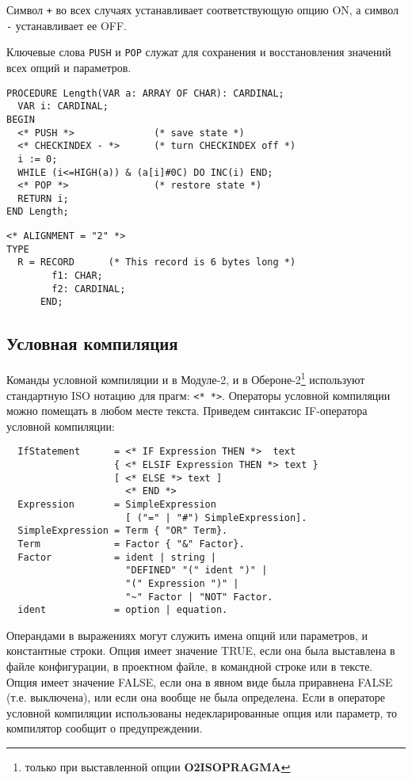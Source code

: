 Символ \verb|+| во всех случаях устанавливает соответствующую опцию
ON, а символ \verb|-| устанавливает ее OFF.

Ключевые слова {\tt PUSH} и {\tt POP} служат для сохранения 
и восстановления значений всех опций и параметров.

\Examples
\begin{verbatim}
PROCEDURE Length(VAR a: ARRAY OF CHAR): CARDINAL;
  VAR i: CARDINAL;
BEGIN
  <* PUSH *>              (* save state *)
  <* CHECKINDEX - *>      (* turn CHECKINDEX off *)
  i := 0;
  WHILE (i<=HIGH(a)) & (a[i]#0C) DO INC(i) END;
  <* POP *>               (* restore state *)
  RETURN i;
END Length;
\end{verbatim}
\begin{verbatim}
<* ALIGNMENT = "2" *>
TYPE
  R = RECORD      (* This record is 6 bytes long *)
        f1: CHAR;
        f2: CARDINAL;
      END;
\end{verbatim}

\subsection{Условная компиляция}\label{m2:pragmas:cc}

Команды условной компиляции и в Модуле-2, и в Обероне-2\footnote
{только при выставленной опции {\bf O2ISOPRAGMA}}
используют стандартную ISO нотацию для прагм: \verb|<* *>|.
Операторы условной компиляции можно помещать в любом месте текста.
Приведем синтаксис IF-оператора условной компиляции:
\begin{verbatim}
  IfStatement      = <* IF Expression THEN *>  text
                   { <* ELSIF Expression THEN *> text }
                   [ <* ELSE *> text ]
                     <* END *>
  Expression       = SimpleExpression
                     [ ("=" | "#") SimpleExpression].
  SimpleExpression = Term { "OR" Term}.
  Term             = Factor { "&" Factor}.
  Factor           = ident | string |
                     "DEFINED" "(" ident ")" |
                     "(" Expression ")" |
                     "~" Factor | "NOT" Factor.
  ident            = option | equation.
\end{verbatim}

Операндами в выражениях могут служить имена опций или параметров, 
и константные строки. Опция имеет значение 
TRUE, если она была выставлена в файле конфигурации, в проектном файле,
в командной строке или в тексте. 
Опция имеет значение FALSE, если она в явном виде была приравнена
FALSE (т.е. выключена), или если она вообще не была определена.
Если в операторе условной компиляции использованы недекларированные
опция или параметр, то компилятор сообщит о предупреждении.

